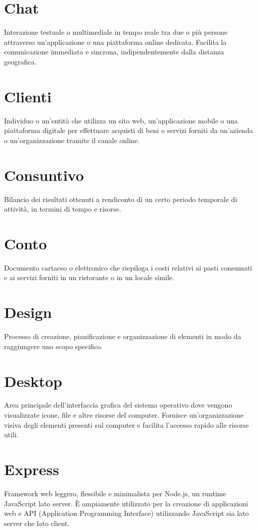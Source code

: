 \section{Chat}
Interazione testuale o multimediale in tempo reale tra due o più persone attraverso un'applicazione o una piattaforma online dedicata. Facilita la comunicazione immediata e sincrona, indipendentemente dalla distanza geografica.

\section{Clienti}
Individuo o un'entità che utilizza un sito web, un'applicazione mobile o una piattaforma digitale per effettuare acquisti di beni o servizi forniti da un'azienda o un'organizzazione tramite il canale online.

\section{Consuntivo}
Bilancio dei risultati ottenuti a rendiconto di un certo periodo temporale di attività, in termini di tempo e risorse.

\section{Conto}
Documento cartaceo o elettronico che riepiloga i costi relativi ai pasti consumati e ai servizi forniti in un ristorante o in un locale simile.

\section{Design}
Processo di creazione, pianificazione e organizzazione di elementi in modo da raggiungere uno scopo specifico.

\section{Desktop}
Area principale dell'interfaccia grafica del sistema operativo dove vengono visualizzate icone, file e altre risorse del computer. Fornisce un'organizzazione visiva degli elementi presenti sul computer e facilita l'accesso rapido alle risorse utili.

\section{Express}
Framework web leggero, flessibile e minimalista per Node.js, un runtime JavaScript lato server. È ampiamente utilizzato per la creazione di applicazioni web e API (Application Programming Interface) utilizzando JavaScript sia lato server che lato client.

